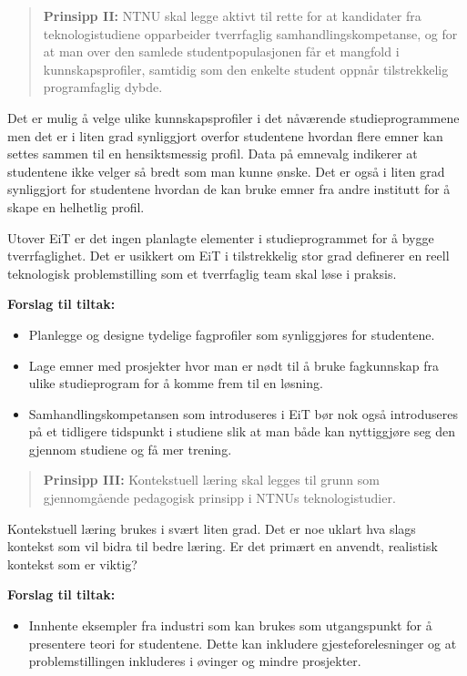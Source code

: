 \begin{quote}
	\textbf{Prinsipp II:} NTNU skal legge aktivt til rette for at kandidater fra teknologistudiene opparbeider tverrfaglig samhandlingskompetanse, og for at man over den samlede studentpopulasjonen får et mangfold i kunnskapsprofiler, samtidig som den enkelte student oppnår tilstrekkelig programfaglig dybde.
\end{quote}

Det er mulig å velge ulike kunnskapsprofiler i det nåværende studieprogrammene men det er i liten grad synliggjort overfor studentene hvordan flere emner kan settes sammen til en hensiktsmessig profil. Data på emnevalg indikerer at studentene ikke velger så bredt som man kunne ønske. Det er også i liten grad synliggjort for studentene hvordan de kan bruke emner fra andre institutt for å skape en helhetlig profil.

Utover EiT er det ingen planlagte elementer i studieprogrammet for å bygge tverrfaglighet. Det er usikkert om EiT i tilstrekkelig stor grad definerer en reell teknologisk problemstilling som et tverrfaglig team skal løse i praksis. 

\textbf{Forslag til tiltak:}

\begin{itemize}
    \item Planlegge og designe tydelige fagprofiler som synliggjøres for studentene.
	\item Lage emner med prosjekter hvor man er nødt til å bruke fagkunnskap fra ulike studieprogram for å komme frem til en løsning.
	\item Samhandlingskompetansen som introduseres i EiT bør nok også introduseres på et tidligere tidspunkt i studiene slik at man både kan nyttiggjøre seg den gjennom studiene og få mer trening.
\end{itemize}

\begin{quote}
	\textbf{Prinsipp III:} Kontekstuell læring skal legges til grunn som gjennomgående pedagogisk prinsipp i NTNUs teknologistudier.
\end{quote}

Kontekstuell læring brukes i svært liten grad. Det er noe uklart hva slags kontekst som vil bidra til bedre læring. Er det primært en anvendt, realistisk kontekst som er viktig?

\textbf{Forslag til tiltak:}

\begin{itemize}
    \item Innhente eksempler fra industri som kan brukes som utgangspunkt for å presentere teori for studentene. Dette kan inkludere gjesteforelesninger og at problemstillingen inkluderes i øvinger og mindre prosjekter.
\end{itemize}

